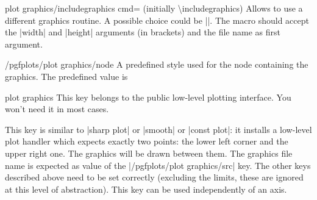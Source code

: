 {{\begin{pgfplotskey}{plot graphics/includegraphics cmd= (initially \textbackslash includegraphics)}
    Allows to use a different graphics routine. A possible choice could be
    |\pgfimage|. The macro should accept the |width| and |height| arguments (in
    brackets) and the file name as first argument.
\end{pgfplotskey}

\begin{stylekey}{/pgfplots/plot graphics/node}
    A predefined style used for the \Tikz{} node containing the graphics. The
    predefined value is
\begin{codeexample}
\end{codeexample}
\end{stylekey}

\begin{pgfplotskey}{plot graphics}
    This key belongs to the public low-level plotting interface. You won't need
    it in most cases.

    This key is similar to |sharp plot| or |smooth| or |const plot|: it
    installs a low-level plot handler which expects exactly two points: the
    lower left corner and the upper right one. The graphics will be drawn
    between them. The graphics file name is expected as value of the
    |/pgfplots/plot graphics/src| key. The other keys described above need to
    be set correctly (excluding the limits, these are ignored at this level of
    abstraction). This key can be used independently of an axis.
\end{pgfplotskey}

}}
